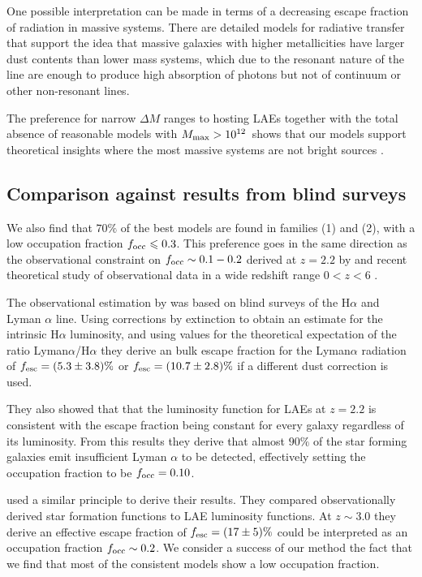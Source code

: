 \documentclass[usenatbib]{mn2e}
\newcommand{\ly}{{\ifmmode{{\rm Ly}\alpha}\else{Ly$\alpha$~}\fi}}
\newcommand{\hMsun}{{\ifmmode{h^{-1}{\rm
        {M_{\odot}}}}\else{$h^{-1}{\rm{M_{\odot}}}$}\fi}}
\begin{document}
One possible interpretation can be made in terms of a decreasing escape
fraction of \ly radiation in massive systems. There are detailed models for
radiative transfer that support the idea that massive galaxies with
higher metallicities have larger dust contents than lower mass
systems, which due to the resonant nature of the \ly line are enough
to produce high absorption of \ly photons but not of continuum or
other non-resonant lines.  

The preference for narrow $\Delta M$ ranges to hosting LAEs together
with the total absence of reasonable models with $M_{\rm max}>
10^{12}$\hMsun \  shows that our models support theoretical insights
where the most massive systems are not bright \ly sources
\citep{ForeroRomero2012}.   

\subsection{Comparison against results from blind surveys}

We also find that $70\%$ of the best models are found in families (1)
and (2), with a low occupation fraction $f_{\rm occ}\leq 0.3$. This
preference goes in the same direction as the observational constraint
on $f_{\rm occ}\sim 0.1-0.2$ derived at $z=2.2$ by \cite{Hayes2010}
and recent theoretical study of observational data in a wide redshift
range $0<z<6$  \citep{Dijkstra2013}. 

The observational estimation by \cite{Hayes2010} was based on blind
surveys of the H$\alpha$ and Lyman $\alpha$ line. Using corrections by
extinction to obtain an estimate for the intrinsic H$\alpha$
luminosity, and using values for the theoretical expectation of the
ratio Lyman$\alpha$/H$\alpha$ they derive an bulk escape fraction for
the Lyman$\alpha$ radiation of $f_{\rm esc}=(5.3\pm 3.8)\%$ or $f_{\rm
  esc}=(10.7\pm 2.8)\%$ if a different dust correction is used. 

They also showed that that the luminosity function for LAEs at $z=2.2$ is
consistent with the escape fraction being constant for every galaxy
regardless of its luminosity. From this results they derive that
almost $90\%$ of the star forming galaxies emit insufficient
Lyman $\alpha$ to be detected, effectively setting the occupation
fraction to be $f_{\rm occ}=0.10$.  

\cite{Dijkstra2013} used a similar principle to derive their results. They
compared observationally derived star formation functions to LAE
luminosity functions. At $z\sim 3.0$ they derive an effective escape
fraction of $f_{\rm esc}=(17\pm 5)\%$ could be interpreted as an
occupation fraction $f_{\rm occ}\sim 0.2$.  We consider a success of
our method the fact that we find that most of the consistent models
show a low occupation fraction.    
\end{document}
